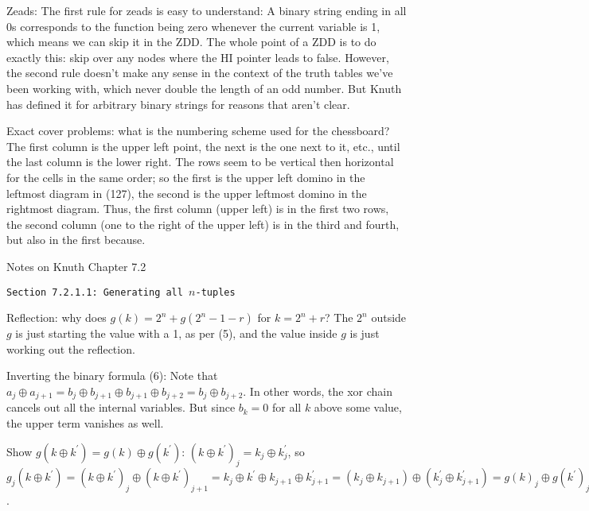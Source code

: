
\noindent [p 250] Zeads: The first rule for zeads is easy to 
understand: A binary string ending in all 0s corresponds to
the function being zero whenever the current variable is 1, which 
means we can skip it in the ZDD.  The whole point of a ZDD
is to do exactly this: skip over any nodes where the HI pointer
leads to false.  However, the second rule doesn't
make any sense in the context of the truth tables we've been working
with, which never double the length of an odd number.  But Knuth
has defined it for arbitrary binary strings for reasons that aren't
clear.

 Exact cover problems: what is
the numbering scheme used for the chessboard?  The first
column is the upper left point, the next is the one next to it, etc.,
until the last column is the lower right.  The rows seem to be
vertical then horizontal for the cells in the same order;
so the first is the upper left domino in the leftmost diagram in (127),
the second is the upper leftmost domino in the rightmost
diagram.  Thus, the first column (upper left) is in the first two rows,
the second column (one to the right of the upper left) is
in the third and fourth, but also in the first because.


\vfil\break
\centerline{Notes on Knuth Chapter 7.2}
\vskip 0.3in
\centerline {\tt Section 7.2.1.1: Generating all $n$-tuples}
\vskip 0.2in

\noindent [p 284] Reflection: why does $g\left(k\right) = 2^n + g\left(
2^n - 1 - r\right)$ for $k = 2^n + r$?  The $2^n$ outside $g$ is
just starting the value with a 1, as per (5), and the value inside
$g$ is just working out the reflection.

 Inverting the binary formula (6): Note that
$a_j \oplus a_{j + 1} = b_j \oplus b_{j+1} \oplus b_{j+1} \oplus b_{j+2}
= b_j \oplus b_{j+2}$.  In other words, the xor chain cancels
out all the internal variables.  But since $b_k = 0$ for all
$k$ above some value, the upper term vanishes as well.

 Show $g\left(k \oplus k^{\prime}\right) = 
g\left(k\right) \oplus g\left(k^{\prime}\right)$:
$\left(k \oplus k^{\prime}\right)_j = k_j \oplus k^{\prime}_j$,
so $g_j\left(k \oplus k^{\prime}\right) = \left(k \oplus k^{\prime}\right)_j
\oplus \left(k \oplus k^{\prime}\right)_{j+1} =
k_j \oplus k^{\prime} \oplus k_{j+1} \oplus k^{\prime}_{j+1} =
\left(k_j \oplus k_{j+1}\right) \oplus \left(k^{\prime}_j \oplus k^{\prime}_{j+1}
\right) = g\left(k\right)_j \oplus g\left(k^{\prime}\right)_j$.

